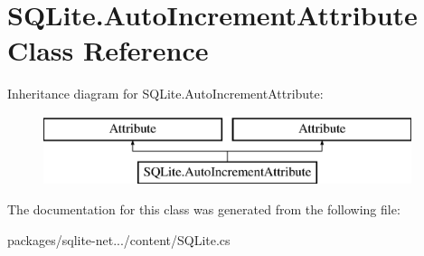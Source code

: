 \hypertarget{classSQLite_1_1AutoIncrementAttribute}{\section{S\-Q\-Lite.\-Auto\-Increment\-Attribute Class Reference}
\label{classSQLite_1_1AutoIncrementAttribute}
}
Inheritance diagram for S\-Q\-Lite.\-Auto\-Increment\-Attribute\-:\begin{figure}[H]
\begin{center}
\leavevmode
\includegraphics[height=2.000000cm]{classSQLite_1_1AutoIncrementAttribute}
\end{center}
\end{figure}


The documentation for this class was generated from the following file\-:\begin{DoxyCompactItemize}
\item 
packages/sqlite-\/net.../content/S\-Q\-Lite.\-cs\end{DoxyCompactItemize}
